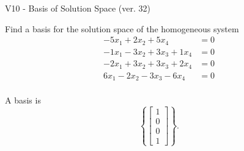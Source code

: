 \begin{exercise}
  \begin{exerciseTitle}V10 - Basis of Solution Space (ver. 32)\end{exerciseTitle}
  \begin{exerciseStatement}
    Find a basis for the solution space of the homogeneous system 
\begin{align*}
 -5 x_ 1 + 2 x_ 2 + 5 x_ 4 &= 0  \\ 
  -1 x_ 1 -3 x_ 2 + 3 x_ 3 + 1 x_ 4 &= 0  \\ 
  -2 x_ 1 + 3 x_ 2 + 3 x_ 3 + 2 x_ 4 &= 0  \\ 
  6 x_ 1 -2 x_ 2 -3 x_ 3 -6 x_ 4 &= 0  \\ 
 \end{align*}


 
  \end{exerciseStatement}

  \begin{exerciseAnswer}
   A basis is   
\[\left\{\left[\begin{array}{c}
1 \\
0 \\
0 \\
1
\end{array}\right]\right\}.\]

  


  \end{exerciseAnswer}
\end{exercise}